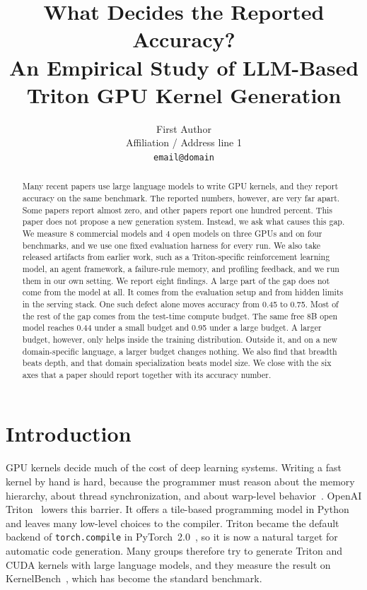 \documentclass[11pt]{article}
\title{What Decides the Reported Accuracy? \\ An Empirical Study of LLM-Based Triton GPU Kernel Generation}
\author{First Author \\
  Affiliation / Address line 1 \\
  \texttt{email@domain} \\}
\begin{document}
\maketitle
\begin{abstract}
Many recent papers use large language models to write GPU kernels, and they report
accuracy on the same benchmark. The reported numbers, however, are very far apart.
Some papers report almost zero, and other papers report one hundred percent.
This paper does not propose a new generation system. Instead, we ask what causes this gap.
We measure 8 commercial models and 4 open models on three GPUs and on four benchmarks,
and we use one fixed evaluation harness for every run. We also take released artifacts from
earlier work, such as a Triton-specific reinforcement learning model, an agent framework,
a failure-rule memory, and profiling feedback, and we run them in our own setting.
We report eight findings. A large part of the gap does not come from the model at all.
It comes from the evaluation setup and from hidden limits in the serving stack. One such
defect alone moves accuracy from 0.45 to 0.75. Most of the rest of the gap comes from the
test-time compute budget. The same free 8B open model reaches 0.44 under a small budget and
0.95 under a large budget. A larger budget, however, only helps inside the training
distribution. Outside it, and on a new domain-specific language, a larger budget changes
nothing. We also find that breadth beats depth, and that domain specialization beats model
size. We close with the six axes that a paper should report together with its accuracy number.
\end{abstract}

\section{Introduction}\label{sec:introduction}

GPU kernels decide much of the cost of deep learning systems. Writing a fast kernel by hand
is hard, because the programmer must reason about the memory hierarchy, about thread
synchronization, and about warp-level behavior~\citep{kirk2016programming}. OpenAI
Triton~\citep{tillet2019triton} lowers this barrier. It offers a tile-based programming model in
Python and leaves many low-level choices to the compiler. Triton became the default backend of
\texttt{torch.compile} in PyTorch~2.0~\citep{ansel2024pytorch2}, so it is now a natural target for
automatic code generation. Many groups therefore try to generate Triton and CUDA kernels with
large language models, and they measure the result on
KernelBench~\citep{ouyang2024kernelbench}, which has become the standard benchmark.
\end{document}
